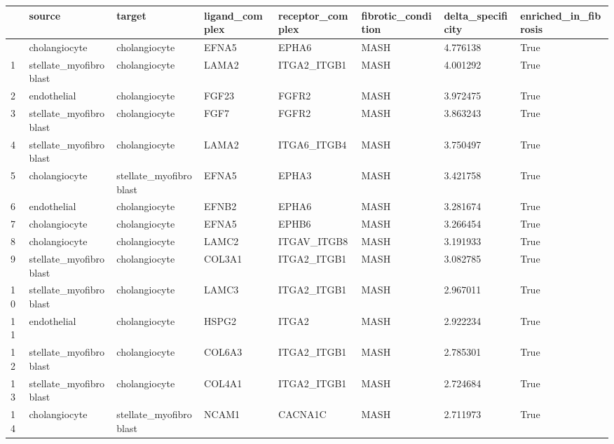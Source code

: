 \documentclass[
  letterpaper,
  DIV=11,
  numbers=noendperiod]{scrartcl}
\newcounter{none} %
\begin{document}
{\def\LTcaptype{none} %
\begin{longtable}[]{@{}llllllll@{}}
\toprule\noalign{}
& source & target & ligand\_complex & receptor\_complex &
fibrotic\_condition & delta\_specificity & enriched\_in\_fibrosis \\
\midrule\noalign{}
\endhead
\bottomrule\noalign{}
\endlastfoot
0 & cholangiocyte & cholangiocyte & EFNA5 & EPHA6 & MASH & 4.776138 &
True \\
1 & stellate\_myofibroblast & cholangiocyte & LAMA2 & ITGA2\_ITGB1 &
MASH & 4.001292 & True \\
2 & endothelial & cholangiocyte & FGF23 & FGFR2 & MASH & 3.972475 &
True \\
3 & stellate\_myofibroblast & cholangiocyte & FGF7 & FGFR2 & MASH &
3.863243 & True \\
4 & stellate\_myofibroblast & cholangiocyte & LAMA2 & ITGA6\_ITGB4 &
MASH & 3.750497 & True \\
5 & cholangiocyte & stellate\_myofibroblast & EFNA5 & EPHA3 & MASH &
3.421758 & True \\
6 & endothelial & cholangiocyte & EFNB2 & EPHA6 & MASH & 3.281674 &
True \\
7 & cholangiocyte & cholangiocyte & EFNA5 & EPHB6 & MASH & 3.266454 &
True \\
8 & cholangiocyte & cholangiocyte & LAMC2 & ITGAV\_ITGB8 & MASH &
3.191933 & True \\
9 & stellate\_myofibroblast & cholangiocyte & COL3A1 & ITGA2\_ITGB1 &
MASH & 3.082785 & True \\
10 & stellate\_myofibroblast & cholangiocyte & LAMC3 & ITGA2\_ITGB1 &
MASH & 2.967011 & True \\
11 & endothelial & cholangiocyte & HSPG2 & ITGA2 & MASH & 2.922234 &
True \\
12 & stellate\_myofibroblast & cholangiocyte & COL6A3 & ITGA2\_ITGB1 &
MASH & 2.785301 & True \\
13 & stellate\_myofibroblast & cholangiocyte & COL4A1 & ITGA2\_ITGB1 &
MASH & 2.724684 & True \\
14 & cholangiocyte & stellate\_myofibroblast & NCAM1 & CACNA1C & MASH &
2.711973 & True \\
\end{longtable}
}
\end{document}
